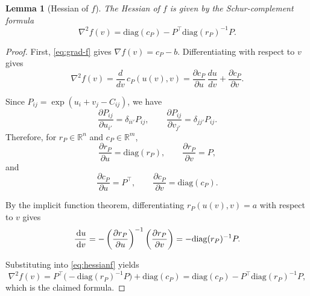 \documentclass{article}
\newcommand{\dd}{\,{\rm d}}
\theoremstyle{plain}
\newtheorem{lemma}{Lemma}
\theoremstyle{remark}
\begin{document}
\begin{lemma}[Hessian of $f$]
The Hessian of $f$ is given by the Schur-complement formula
\begin{equation}
\nabla^2 f(v) = \mathrm{diag}(c_P) - P^\top \mathrm{diag}(r_P)^{-1} P.
\end{equation}
\end{lemma}
\begin{proof}
First, \eqref{eq:grad-f} gives $\nabla f(v)=c_P-b$. Differentiating with respect to $v$ gives
\begin{equation}\label{eq:hessianf}
\nabla^2 f(v)=\frac{d}{dv}\,c_P(u(v),v)=\frac{\partial c_P}{\partial u}\,\frac{du}{dv}+\frac{\partial c_P}{\partial v}.
\end{equation}

Since $P_{ij}=\exp(u_i+v_j-C_{ij})$, we have
$$
\frac{\partial P_{ij}}{\partial u_{i'}}=\delta_{ii'}P_{ij},\qquad
\frac{\partial P_{ij}}{\partial v_{j'}}=\delta_{jj'}P_{ij}.
$$
Therefore, for $r_P\in\mathbb{R}^n$ and $c_P\in\mathbb{R}^m$,
$$
\frac{\partial r_P}{\partial u}=\mathrm{diag}(r_P),\qquad
\frac{\partial r_P}{\partial v}=P,
$$
and
$$
\frac{\partial c_P}{\partial u}=P^\top,\qquad
\frac{\partial c_P}{\partial v}=\mathrm{diag}(c_P).
$$

By the implicit function theorem, differentiating $r_P(u(v),v)=a$ with respect to $v$ gives
$$
\frac{\dd u}{\dd v}=-\left(\frac{\partial r_P}{\partial u}\right)^{-1}\left(\frac{\partial r_P}{\partial v}\right)=-\mathrm{diag}(r_P)^{-1}P.
$$


Substituting into \eqref{eq:hessianf} yields
$$
\nabla^2 f(v)=P^\top\bigl(-\mathrm{diag}(r_P)^{-1}P\bigr)+\mathrm{diag}(c_P)
=\mathrm{diag}(c_P)-P^\top \mathrm{diag}(r_P)^{-1}P,
$$
which is the claimed formula.
\end{proof}

\end{document}
